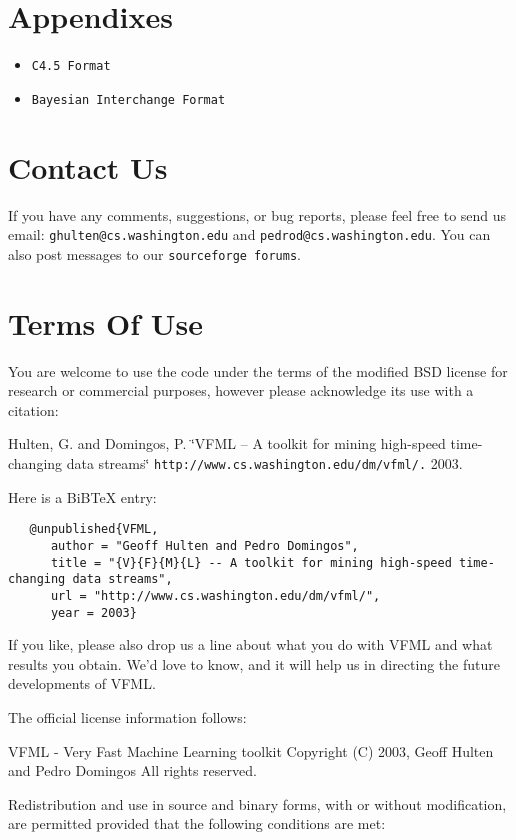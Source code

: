 \section{Appendixes}\label{appendixes}
\begin{itemize}
\item {\tt C4.5 Format}\item {\tt Bayesian Interchange Format}\end{itemize}
\section{Contact Us}\label{contact}
If you have any comments, suggestions, or bug reports, please feel free to send us email: {\tt ghulten@cs.washington.edu} and {\tt pedrod@cs.washington.edu}. You can also post messages to our {\tt sourceforge forums}.\section{Terms Of Use}\label{license}
You are welcome to use the code under the terms of the modified BSD license for research or commercial purposes, however please acknowledge its use with a citation:

Hulten, G. and Domingos, P. \char`\"{}VFML -- A toolkit for mining high-speed time-changing data streams\char`\"{} {\tt http://www.cs.washington.edu/dm/vfml/.} 2003.

Here is a Bi\-BTe\-X entry:



\footnotesize\begin{verbatim}
   @unpublished{VFML,
      author = "Geoff Hulten and Pedro Domingos",
      title = "{V}{F}{M}{L} -- A toolkit for mining high-speed time-changing data streams",
      url = "http://www.cs.washington.edu/dm/vfml/",
      year = 2003}
\end{verbatim}\normalsize


If you like, please also drop us a line about what you do with VFML and what results you obtain. We'd love to know, and it will help us in directing the future developments of VFML.





The official license information follows:

VFML - Very Fast Machine Learning toolkit Copyright (C) 2003, Geoff Hulten and Pedro Domingos All rights reserved.

Redistribution and use in source and binary forms, with or without modification, are permitted provided that the following conditions are met:

